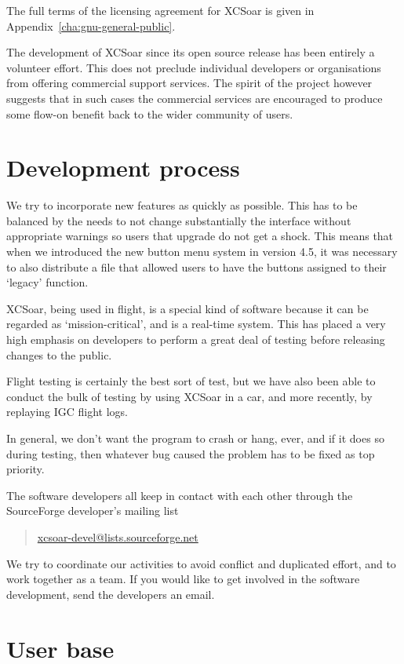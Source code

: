 The full terms of the licensing agreement for XCSoar is given in
Appendix~\ref{cha:gnu-general-public}.

The development of XCSoar since its open source release has been
entirely a volunteer effort.  This does not preclude individual
developers or organisations from offering commercial support services.
The spirit of the project however suggests that in such cases the
commercial services are encouraged to produce some flow-on benefit
back to the wider community of users.

\section{Development process}

We try to incorporate new features as quickly as possible.  This has
to be balanced by the needs to not change substantially the interface
without appropriate warnings so users that upgrade do not get a shock.
This means that when we introduced the new button menu system in
version 4.5, it was necessary to also distribute a file that allowed
users to have the buttons assigned to their `legacy' function.

XCSoar, being used in flight, is a special kind of software because it
can be regarded as `mission-critical', and is a real-time system.
This has placed a very high emphasis on developers to perform a great
deal of testing before releasing changes to the public.  

Flight testing is certainly the best sort of test, but we have also
been able to conduct the bulk of testing by using XCSoar in a car,
and more recently, by replaying IGC flight logs.

In general, we don't want the program to crash or hang, ever, and if
it does so during testing, then whatever bug caused the problem has to
be fixed as top priority.

The software developers all keep in contact with each other through
the SourceForge developer's mailing list
\begin{quote}
\url{xcsoar-devel@lists.sourceforge.net}
\end{quote}
We try to coordinate our activities to avoid conflict and duplicated
effort, and to work together as a team.  If you would like to get
involved in the software development, send the developers an email.

\section{User base}

